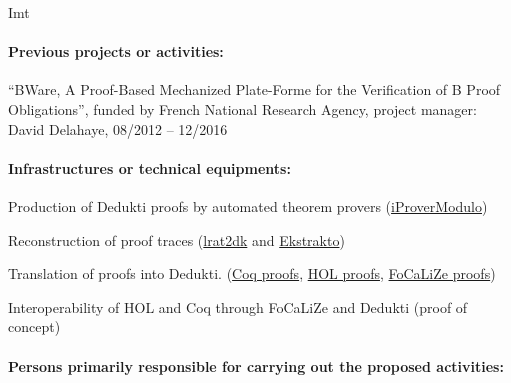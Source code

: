 \begin{sitedescription}{Imt}
\paragraph*{Previous projects or activities:}

\begin{compactitem}
\item ``BWare, A Proof-Based Mechanized Plate-Forme for the Verification of B Proof Obligations'',
funded by French National Research Agency, project manager: David
Delahaye, 08/2012 -- 12/2016
\end{compactitem}

\paragraph*{Infrastructures or technical equipments:}

\begin{compactitem}
\item Production of Dedukti proofs by automated theorem provers (\href{http://www.ensiie.fr/~guillaume.burel/blackandwhite_iProverModulo.html.en}{iProverModulo})
\item Reconstruction of proof traces
  (\href{https://github.com/gburel/lrat2dk}{lrat2dk} and \href{https://github.com/Deducteam/ekstrakto}{Ekstrakto})
\item Translation of proofs into Dedukti. (\href{http://www.ensiie.fr/~guillaume.burel/blackandwhite_coqInE.html.en}{Coq
  proofs}, \href{http://deducteam.gforge.inria.fr/holide/}{HOL
  proofs}, \href{http://deducteam.gforge.inria.fr/focalide/}{FoCaLiZe proofs})
  \item Interoperability of HOL and Coq through FoCaLiZe and Dedukti (proof of concept)
\end{compactitem}

\paragraph*{Persons primarily responsible for carrying out the proposed activities:}

\begin{compactitem} %


\end{compactitem}
\end{sitedescription}
